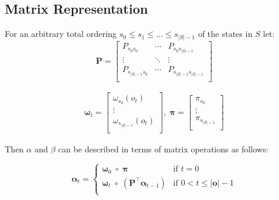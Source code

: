 \subsection{Matrix Representation}\label{subsec:matrixoperations}
For an arbitrary total ordering $s_0 \leq s_1 \leq \dots \leq s_{|S|-1}$ of the states in $S$ let:
\begin{equation}
    \boldsymbol{P} =
    \begin{bmatrix}
        P_{s_0 s_0}      & \cdots & P_{s_0 s_{|S|-1}}      \\
        \vdots           & \ddots & \vdots                 \\
        P_{s_{|S|-1}s_0} & \cdots & P_{s_{|S|-1}s_{|S|-1}} \\
    \end{bmatrix}
    \label{eq:transition-matrix}
\end{equation}

\begin{align}
    \boldsymbol{\omega}_t = \begin{bmatrix}
                                \omega_{s_0}(o_t)       \\
                                \vdots                  \\
                                \omega_{s_{|S|-1}}(o_t) \\
    \end{bmatrix}, \;
    \boldsymbol{\pi} = \begin{bmatrix}
                           \pi_{s_0}       \\
                           \vdots          \\
                           \pi_{s_{|S|-1}} \\
    \end{bmatrix}
\end{align}

Then $\alpha$ and $\beta$ can be described in terms of matrix operations as follows:

\begin{equation}
    \label{eq:alpha}
    \boldsymbol{\alpha}_t =
    \begin{cases}
        \boldsymbol{\omega}_0 \; \circ \; \boldsymbol{\pi}   & \text{if } t = 0          \\
        \boldsymbol{\omega}_t \; \circ \; \left( \boldsymbol{P}^\top \boldsymbol{\alpha}_{t - 1} \right)   & \text{if } 0 < t \leq |\mathbf{o}|-1 \\
    \end{cases}
\end{equation}


